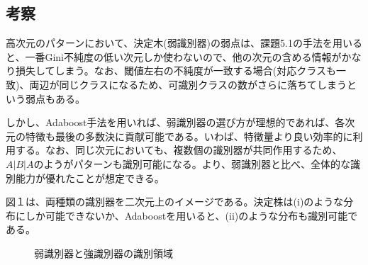 \documentclass[ %
  uplatex,%
  papersize%
]{jsarticle}
\begin{document}
\subsection{考察}
高次元のパターンにおいて、決定木(弱識別器)の弱点は、課題5.1の手法を用いると、一番Gini不純度の低い次元しか使わないので、他の次元の含める情報がかなり損失してしまう。なお、閾値左右の不純度が一致する場合(対応クラスも一致)、両辺が同じクラスになるため、可識別クラスの数がさらに落ちてしまうという弱点もある。

しかし、Adaboost手法を用いれば、弱識別器の選び方が理想的であれば、各次元の特徴も最後の多数決に貢献可能である。いわば、特徴量より良い効率的に利用する。なお、同じ次元においても、複数個の識別器が共同作用するため、$A|B|A$のようがパターンも識別可能になる。より、弱識別器と比べ、全体的な識別能力が優れたことが想定できる。

図１は、両種類の識別器を二次元上のイメージである。決定株は(i)のような分布にしか可能できないか、Adaboostを用いると、(ii)のような分布も識別可能である。

\newpage

\begin{figure}[!h]
\centering
{}
\caption{弱識別器と強識別器の識別領域} 
\end{figure}
\end{document}
